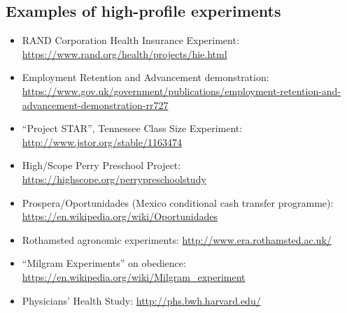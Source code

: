 \documentclass[12pt,a4paper]{article}
\begin{document}
\subsection*{Examples of high-profile experiments}

\begin{itemize}

\item RAND Corporation Health Insurance Experiment: \url{https://www.rand.org/health/projects/hie.html}

\item Employment Retention and Advancement demonstration: \url{https://www.gov.uk/government/publications/employment-retention-and-advancement-demonstration-rr727}

\item ``Project STAR'', Tennessee Class Size Experiment: \url{http://www.jstor.org/stable/1163474}

\item High/Scope Perry Preschool Project: \url{https://highscope.org/perrypreschoolstudy}

\item Prospera/Oportunidades (Mexico conditional cash transfer programme): \url{https://en.wikipedia.org/wiki/Oportunidades}

\item Rothamsted agronomic experiments: \url{http://www.era.rothamsted.ac.uk/}

\item ``Milgram Experiments'' on obedience: \url{https://en.wikipedia.org/wiki/Milgram_experiment}

\item Physicians' Health Study: \url{http://phs.bwh.harvard.edu/}

\end{itemize}



\end{document}
